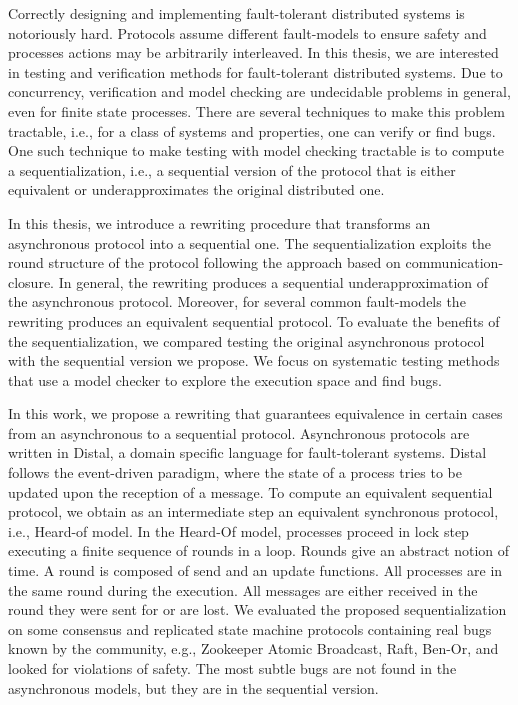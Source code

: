 Correctly designing and implementing fault-tolerant distributed systems is notoriously hard. Protocols assume different fault-models to ensure safety and processes actions may be arbitrarily interleaved. In this thesis, we are interested in testing and verification methods for fault-tolerant distributed systems. Due to concurrency, verification and model checking are undecidable problems in general, even for finite state processes. There are several techniques to make this problem tractable, i.e., for a class of systems and properties, one can verify or find bugs. One such technique to make testing with model checking tractable is to compute a sequentialization, i.e., a sequential version of the protocol that is either equivalent or underapproximates the original distributed one. 

In this thesis, we introduce a rewriting procedure that transforms an asynchronous protocol into a sequential one. The sequentialization exploits the round structure of the protocol following the approach based on communication-closure. In general, the rewriting produces a sequential underapproximation of the asynchronous protocol. Moreover, for several common fault-models the rewriting produces an equivalent sequential protocol. To evaluate the benefits of the sequentialization, we compared testing the original asynchronous protocol with the sequential version we propose. We focus on systematic testing methods that use a model checker to explore the execution space and find bugs.

In this work, we propose a rewriting that guarantees equivalence in certain cases from an asynchronous to a sequential protocol. Asynchronous protocols are written in Distal, a domain specific language for fault-tolerant systems. Distal follows the event-driven paradigm, where the state of a process  tries to be updated upon the reception of a message. To compute an equivalent sequential protocol, we obtain as an intermediate step an equivalent synchronous protocol, i.e., Heard-of model. In the Heard-Of model, processes proceed in lock step executing a finite sequence of rounds in a loop. Rounds give an abstract notion of time. A round is composed of send and an update functions. All processes are in the same round during the execution. All messages are either received in the round they were sent for or are lost. We evaluated the proposed sequentialization on some consensus and replicated state machine protocols containing real bugs known by the community, e.g., Zookeeper Atomic Broadcast, Raft, Ben-Or, and looked for violations of safety. The most subtle bugs are not found in the asynchronous models, but they are in the sequential version.

